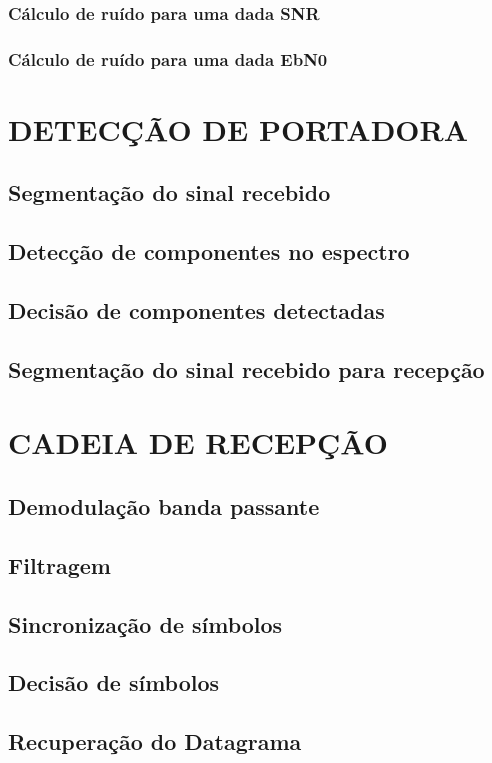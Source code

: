 \subsubsection{Cálculo de ruído para uma dada SNR}\label{sec:calculo_ruido}

\subsubsection{Cálculo de ruído para uma dada EbN0}\label{sec:calculo_ruido_ebn0}

\section{DETECÇÃO DE PORTADORA}\label{sec:detector}

\subsection{Segmentação do sinal recebido}\label{sec:segmentacao}

\subsection{Detecção de componentes no espectro}\label{sec:comparacao_potencia}

\subsection{Decisão de componentes detectadas}\label{sec:decisao}

\subsection{Segmentação do sinal recebido para recepção}\label{sec:segmentacao_recepcao}

\section{CADEIA DE RECEPÇÃO}\label{sec:recepcao}    

\subsection{Demodulação banda passante}\label{sec:demodulacao}

\subsection{Filtragem}\label{sec:filtragem}

\subsection{Sincronização de símbolos}\label{sec:sincronizacao}

\subsection{Decisão de símbolos}\label{sec:decisao_simbolos}

\subsection{Recuperação do Datagrama}\label{sec:decodificacao_convolucional}
